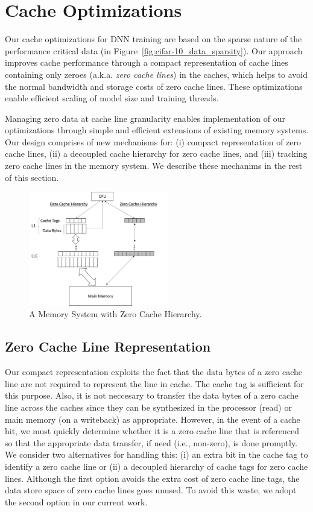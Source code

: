 \section{Cache Optimizations}
\label{sec:cache_opt}

Our cache optimizations for DNN training are based on the sparse nature of the performance critical data (in Figure~\ref{fig:cifar-10_data_sparsity}).  Our approach improves cache performance through a compact representation of cache lines containing only zeroes (a.k.a. \emph{zero cache lines}) in the caches, which helps to avoid  the normal bandwidth and storage costs of zero cache lines. These optimizations enable efficient scaling of model size and training threads.  

Managing zero data at cache line granularity enables implementation of our optimizations through simple and efficient extensions of existing memory systems.  Our design comprises of new mechanisms for: (i) compact representation of zero cache lines, (ii) a decoupled cache hierarchy for zero cache lines, and (iii) tracking zero cache lines in the memory system.  We describe these mechanims in the rest of this section.

\begin{figure}[!t]
\centering
\includegraphics[width=2.4in]{Figures/zero_cache_hierarchy.png}
\caption{A Memory System with Zero Cache Hierarchy.}
\label{fig:zero_cache_hierarchy}
\end{figure}

\subsection{Zero Cache Line Representation}

Our compact representation exploits the fact that the data bytes of a zero cache line are not required to represent the line in cache.  The cache tag is sufficient for this purpose. Also, it is not neccesary to transfer the data bytes of a zero cache line across the caches since they can be synthesized in the processor (read) or main memory (on a writeback) as appropriate.  However, in the event of a cache hit, we must quickly determine whether it is a zero cache line that is referenced so that the appropriate data transfer, if need (i.e., non-zero),  is done promptly. We consider two alternatives for handling this: (i) an extra bit in the cache tag to identify a zero cache line or (ii) a decoupled hierarchy of cache tags for zero cache lines.  Although the first option avoids the extra cost of zero cache line tags, the data store space of zero cache lines goes unused.  To avoid this waste, we adopt the second option in our current work. 


